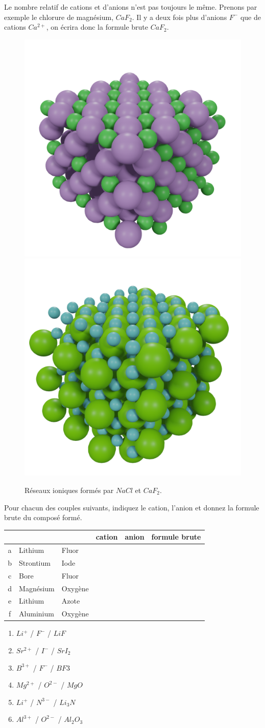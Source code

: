 \documentclass[
  11pt,
  a4paper,
  openany]{book}
\begin{document}
Le nombre relatif de cations et d'anions n'est pas toujours le même. Prenons par exemple le chlorure de magnésium, \(CaF_2\). Il y a deux fois plus d'anions \(F^-\) que de cations \(Ca^{2+}\), on écrira donc la formule brute \(CaF_2\).

\begin{figure}

{\centering \includegraphics[width=0.25\linewidth]{images/NaCl-crystal} \includegraphics[width=0.25\linewidth]{images/CaF2-crystal} 

}

\caption{Réseaux ioniques formés par $NaCl$ et $CaF_2$.}\label{fig:NaClCaF2}
\end{figure}

\begin{Exercise}
Pour chacun des couples suivants, indiquez le cation, l'anion et donnez la formule brute du composé formé.

\end{Exercise}

\begin{longtable}[]{@{}cllccc@{}}
\toprule()
~ & ~ & ~ & cation & anion & formule brute \\
\midrule()
\endhead
a & Lithium & Fluor & & & \\
b & Strontium & Iode & & & \\
c & Bore & Fluor & & & \\
d & Magnésium & Oxygène & & & \\
e & Lithium & Azote & & & \\
f & Aluminium & Oxygène & & & \\
\bottomrule()
\end{longtable}

\begin{Answer}

\begin{enumerate}
\def\labelenumi{\alph{enumi}.}
\item
  \(Li^+\) / \(F^-\) / \(LiF\)
\item
  \(Sr^{2+}\) / \(I^{-}\) / \(SrI_2\)
\item
  \(B^{3+}\) / \(F^-\) / \(BF3\)
\item
  \(Mg^{2+}\) / \(O^{2-}\) / \(MgO\)
\item
  \(Li^+\) / \(N^{3-}\) / \(Li_3N\)
\item
  \(Al^{3+}\) / \(O^{2-}\) / \(Al_2O_3\)
\end{enumerate}

\end{Answer}
\end{document}
